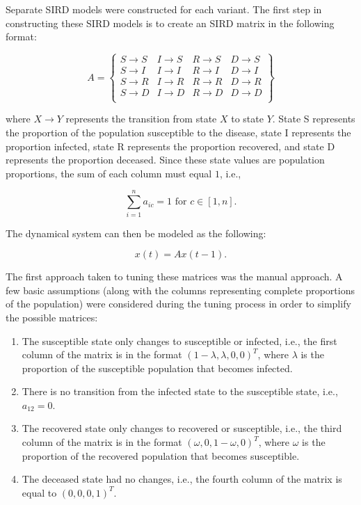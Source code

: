 \documentclass[conference]{IEEEtran}
\begin{document}
Separate SIRD models were constructed for each variant. The first step in constructing these SIRD models is to create an SIRD matrix in the following format:

\begin{equation}
A = \begin{Bmatrix}
  S \rightarrow S & I \rightarrow S & R \rightarrow S & D \rightarrow S \\
  S \rightarrow I & I \rightarrow I & R \rightarrow I & D \rightarrow I \\ 
  S \rightarrow R & I \rightarrow R & R \rightarrow R & D \rightarrow R \\
  S \rightarrow D & I \rightarrow D & R \rightarrow D & D \rightarrow D \\
\end{Bmatrix}
\end{equation}

where $X \rightarrow Y$ represents the transition from state $X$ to state $Y$. State S represents the proportion of the population susceptible to the disease, state I represents the proportion infected, state R represents the proportion recovered, and state D represents the proportion deceased. Since these state values are population proportions, the sum of each column must equal $1$, i.e.,

\begin{equation}
\sum_{i=1}^{n} a_{ic} = 1 \mbox{ for } c \in [1, n].
\end{equation}

The dynamical system can then be modeled as the following:

\begin{equation}
x(t) = Ax(t - 1).
\end{equation}

The first approach taken to tuning these matrices was the manual approach. A few basic assumptions (along with the columns representing complete proportions of the population) were considered during the tuning process in order to simplify the possible matrices:
\begin{enumerate}
  \item The susceptible state only changes to susceptible or infected, i.e., the first column of the matrix is in the format $(1 - \lambda, \lambda, 0, 0)^T$, where $\lambda$ is the proportion of the susceptible population that becomes infected.
  \item There is no transition from the infected state to the susceptible state, i.e., $a_{12} = 0$.
  \item The recovered state only changes to recovered or susceptible, i.e., the third column of the matrix is in the format $(\omega, 0, 1 - \omega, 0)^T$, where $\omega$ is the proportion of the recovered population that becomes susceptible.
  \item The deceased state had no changes, i.e., the fourth column of the matrix is equal to $(0, 0, 0, 1)^T$.
\end{enumerate}
\end{document}
